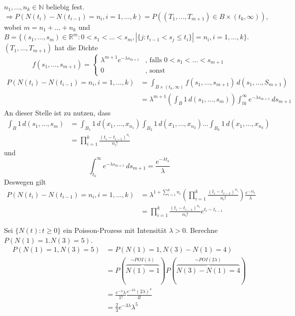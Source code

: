 \documentclass[a4paper,12pt]{article}
\begin{document}
$n_1, ..., n_k \in \mathbb{N}$ beliebig fest.
$$
	\Rightarrow P(N(t_i) - N(t_{i-1}) = n_i, i=1, ..., k) = P((T_1, ..., T_{m+1}) \in B \times (t_k, \infty)),
$$
wobei
$m = n_1 + ... + n_k$ und $B = \{(s_1, ..., s_m)\in \mathbb{R}^m:
	0 < s_1 < ... < s_m, |\{j:t_{i-1}<s_j\leq t_i\}     | = n_i,
	i=1, ..., k
	\}$. $(T_1, ..., T_{m+1})$ hat die Dichte
$$
	f(s_1, ..., s_{m+1}) =
	\begin{cases}
		\lambda^{m+1}e^{-\lambda s_{m+1}} & \text{, falls } 0 < s_1 < ... < s_{m+1} \\
		0                                 & \text{, sonst}
	\end{cases}
$$
\begin{align*}
	P(N(t_i) - N(t_{i-1}) = n_i , i = 1, ..., k) & =
	\int_{B \times (t_k, \infty)}f(s_1, ..., s_{m+1}) \, d(s_1, ..., S_{m+1}) \\
	                                             & = \lambda^{m+1}\left(
	\int_{B}1 \, d(s_1, ..., s_m)\right)\int_{tk}^{\infty}e^{-\lambda s_{m+1}} \, d s_{m+1}
\end{align*}
An dieser Stelle ist zu nutzen, dass
\begin{align*}
	\int_{B} 1 \, d(s_1, ..., s_m) & = \int_{B_1}1 \, d(x_1, ..., x_{n_1}) \int_{B_2}1 \, d(x_1, ..., x_{n_2}) ... \int_{B_k}1 \, d(x_1, ..., x_{n_k}) \\
	                               & = \prod_{i=1}^{k}\frac{(t_i - t_{i-1})^{n_i}}{n_i!}
\end{align*}
und
$$
	\int_{t_k}^{\infty}e^{-\lambda s_{m+1}} \, d s_{m+1} = \frac{e^{-\lambda t_k}}{\lambda}
$$
Deswegen gilt
\begin{align*}
	P(N(t_i) - N(t_{i-1}) = n_i , i = 1, ..., k) & =
	\lambda^{1 + \sum_{i=1}^{k}n_i}\left(  \prod_{i=1}^{k}\frac{(t_i - t_{i-1})^{n_i}}{n_i!}     \right) \frac{e^{-\lambda t_k}}{\lambda} \\
	                                             & =  \prod_{i=1}^{k}\frac{(t_i - t_{i-1})^{n_i}}{n_i!} e^{t_i - t_{i-1}}
\end{align*}

\begin{tcolorbox}[breakable, colframe=blue, colback=white, title=Beispiel 19]
	Sei $\{N(t):t \geq 0\}$ ein Poisson-Prozess mit Intensität $\lambda > 0$.
	Berechne $P(N(1)= 1. N(3) = 5)$.
	\begin{align*}
		P(N(1) = 1, N(3)=5) & = P(N(1) = 1, N(3) - N(1) = 4)                                                                         \\
		                    & = P (  \overbrace{N(1)=1}^{\sim POI(\lambda)}   )P (  \overbrace{N(3)-N(1)=4}^{\sim POI(2\lambda)}   ) \\
		                    & = \frac{e^{-\lambda}\lambda}{1!} \frac{e^{-2\lambda}(2\lambda)^4}{4!}                                  \\
		                    & = \frac{2}{3}e^{-3 \lambda}\lambda^5
	\end{align*}
\end{tcolorbox}
\end{document}
